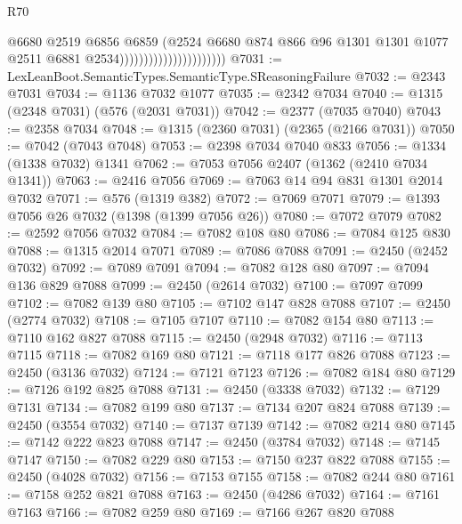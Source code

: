\begin{lexlean}{R70}
\begin{coremodule}
                                              @6680
                                              @2519
                                              @6856
                                              @6859
                                              (@2524
                                                @6680
                                                @874
                                                @866
                                                @96
                                                @1301
                                                @1301
                                                @1077
                                                @2511
                                                @6881
                                                @2534))))))))))))))))))))))
@7031 := LexLeanBoot.SemanticTypes.SemanticType.SReasoningFailure
@7032 := @2343 @7031
@7034 := @1136 @7032 @1077
@7035 := @2342 @7034
@7040 := @1315 (@2348 @7031) (@576 (@2031 @7031))
@7042 := @2377 (@7035 @7040)
@7043 := @2358 @7034
@7048 := @1315 (@2360 @7031) (@2365 (@2166 @7031))
@7050 := @7042 (@7043 @7048)
@7053 := @2398 @7034 @7040 @833
@7056 := @1334 (@1338 @7032) @1341
@7062 := @7053 @7056 @2407 (@1362 (@2410 @7034 @1341))
@7063 := @2416 @7056
@7069 := @7063 @14 @94 @831 @1301 @2014 @7032
@7071 := @576 (@1319 @382)
@7072 := @7069 @7071
@7079 := @1393 @7056 @26 @7032 (@1398 (@1399 @7056 @26))
@7080 := @7072 @7079
@7082 := @2592 @7056 @7032
@7084 := @7082 @108 @80
@7086 := @7084 @125 @830
@7088 := @1315 @2014 @7071
@7089 := @7086 @7088
@7091 := @2450 (@2452 @7032)
@7092 := @7089 @7091
@7094 := @7082 @128 @80
@7097 := @7094 @136 @829 @7088
@7099 := @2450 (@2614 @7032)
@7100 := @7097 @7099
@7102 := @7082 @139 @80
@7105 := @7102 @147 @828 @7088
@7107 := @2450 (@2774 @7032)
@7108 := @7105 @7107
@7110 := @7082 @154 @80
@7113 := @7110 @162 @827 @7088
@7115 := @2450 (@2948 @7032)
@7116 := @7113 @7115
@7118 := @7082 @169 @80
@7121 := @7118 @177 @826 @7088
@7123 := @2450 (@3136 @7032)
@7124 := @7121 @7123
@7126 := @7082 @184 @80
@7129 := @7126 @192 @825 @7088
@7131 := @2450 (@3338 @7032)
@7132 := @7129 @7131
@7134 := @7082 @199 @80
@7137 := @7134 @207 @824 @7088
@7139 := @2450 (@3554 @7032)
@7140 := @7137 @7139
@7142 := @7082 @214 @80
@7145 := @7142 @222 @823 @7088
@7147 := @2450 (@3784 @7032)
@7148 := @7145 @7147
@7150 := @7082 @229 @80
@7153 := @7150 @237 @822 @7088
@7155 := @2450 (@4028 @7032)
@7156 := @7153 @7155
@7158 := @7082 @244 @80
@7161 := @7158 @252 @821 @7088
@7163 := @2450 (@4286 @7032)
@7164 := @7161 @7163
@7166 := @7082 @259 @80
@7169 := @7166 @267 @820 @7088

\end{coremodule}
\end{lexlean}
